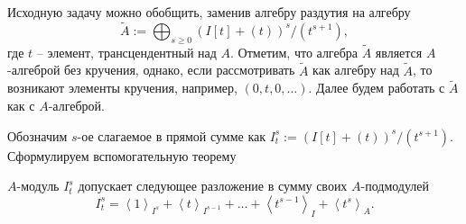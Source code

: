     Исходную задачу можно обобщить, заменив алгебру раздутия на алгебру
    \begin{equation*}
        \widetilde{A} := \bigoplus_{s \geq 0}{(I[t] + (t))^s / (t^{s + 1})},
    \end{equation*}
    где $t$ -- элемент, трансцендентный над $A$. Отметим, что алгебра $\widetilde{A}$ является
    $A$-алгеброй без кручения, однако, если рассмотривать $\widetilde{A}$ как алгебру над 
    $\widetilde{A}$, то возникают элементы кручения, например, $(0, t, 0, \dots)$. Далее будем 
    работать с $\widetilde{A}$ как с $A$-алгеброй.

    Обозначим $s$-ое слагаемое в прямой сумме как $I^s_t := (I[t] + (t))^s / (t^{s + 1})$.
    Сформулируем вспомогательную теорему
    \begin{Lemma}
        $A$-модуль $I^s_t$ допускает следующее разложение в сумму своих $A$-под\-мо\-ду\-лей
        \begin{equation} \label{sl}
            I^s_t = \left< 1  \right>_{I^s} + 
                    \left< t \right>_{I^{s-1}} + 
                    \dots +
                    \left< t^{s-1} \right>_{I} + 
                    \left< t^s \right>_A.
        \end{equation}
    \end{Lemma}
